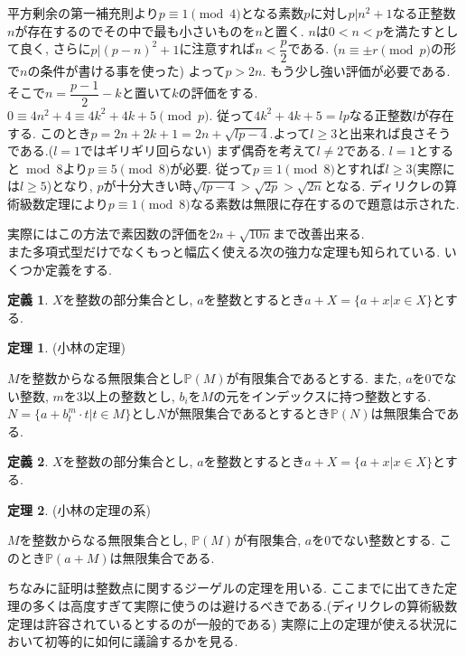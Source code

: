 \documentclass{ltjsarticle}
\theoremstyle{definition}
\newtheorem{thm}{定理}
\newtheorem{dfn}{定義}
\begin{document}
平方剰余の第一補充則より$p\equiv 1\pmod4$となる素数$p$に対し$p|n^2+1$なる正整数$n$が存在するのでその中で最も小さいものを$n$と置く. $n$は$0<n<p$を満たすとして良く, さらに$p|(p-n)^2+1$に注意すれば$n<\dfrac p2$である. ($n\equiv \pm r\pmod p$の形で$n$の条件が書ける事を使った) よって$p>2n$. もう少し強い評価が必要である. そこで$n=\dfrac{p-1}2-k$と置いて$k$の評価をする. $0\equiv4n^2+4\equiv 4k^2+4k+5 \pmod p$. 従って$4k^2+4k+5=lp$なる正整数$l$が存在する. このとき$p=2n+2k+1=2n+\sqrt{lp-4}$.よって$l\geq3$と出来れば良さそうである.($l=1$ではギリギリ回らない) まず偶奇を考えて$l\neq2$である. $l=1$とすると$\bmod8$より$p\equiv5\pmod 8$が必要. 従って$p\equiv1\pmod8$とすれば$l\geq3$(実際には$l\geq5$)となり, $p$が十分大きい時$\sqrt{lp-4}>\sqrt{2p}>\sqrt{2n}$となる. ディリクレの算術級数定理により$p\equiv1\pmod8$なる素数は無限に存在するので題意は示された.

実際にはこの方法で素因数の評価を$2n+\sqrt{10n}$まで改善出来る.\\

また多項式型だけでなくもっと幅広く使える次の強力な定理も知られている. いくつか定義をする.
\begin{dfn}
$X$を整数の部分集合とし, $a$を整数とするとき$a+X=\{a+x|x\in X\}$とする.
\end{dfn}

\begin{thm}(小林の定理)

$M$を整数からなる無限集合とし$\mathbb P(M)$が有限集合であるとする. また, $a$を$0$でない整数, $m$を$3$以上の整数とし, $b_i$を$M$の元をインデックスに持つ整数とする. $N=\{a+b_t^m\cdot t|t\in M\}$とし$N$が無限集合であるとするとき$\mathbb P(N)$は無限集合である.
\end{thm}

\begin{dfn}
$X$を整数の部分集合とし, $a$を整数とするとき$a+X=\{a+x|x\in X\}$とする.
\end{dfn}

\begin{thm}(小林の定理の系)

$M$を整数からなる無限集合とし, $\mathbb P(M)$が有限集合, $a$を$0$でない整数とする. このとき$\mathbb P(a+M)$は無限集合である.
\end{thm}

ちなみに証明は整数点に関するジーゲルの定理を用いる.
ここまでに出てきた定理の多くは高度すぎて実際に使うのは避けるべきである.(ディリクレの算術級数定理は許容されているとするのが一般的である) 実際に上の定理が使える状況において初等的に如何に議論するかを見る.
\end{document}
